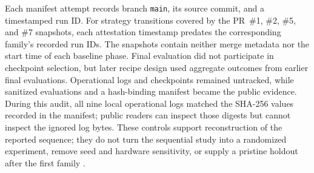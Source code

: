 Each manifest attempt records branch \texttt{main}, its source commit, and a
timestamped run ID. For strategy transitions covered by the PR~\#1, \#2, \#5,
and \#7 snapshots, each attestation timestamp predates the corresponding
family's recorded run IDs. The snapshots contain neither merge metadata nor the
start time of each baseline phase. Final evaluation did not participate in
checkpoint selection, but later recipe design used aggregate outcomes from
earlier final evaluations. Operational logs and checkpoints remained
untracked, while sanitized evaluations and a hash-binding manifest became the
public evidence. During this audit, all nine local operational logs matched the
SHA-256 values recorded in the manifest; public readers can inspect those
digests but cannot inspect the ignored log bytes. These controls support
reconstruction of the reported sequence; they do not turn the sequential study
into a randomized experiment, remove seed and hardware sensitivity, or supply
a pristine holdout after the first family \citep{pytorchreproducibility}.
%
%
%
